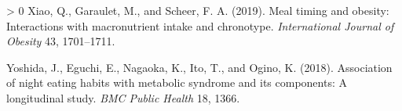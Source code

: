 \documentclass[utf8]{frontiersSCNS}
\newlength{\cslhangindent}
\newenvironment{CSLReferences}[3] %
 {%
  \setlength{\parindent}{0pt}
  \ifodd #1 \everypar{\setlength{\hangindent}{\cslhangindent}}\ignorespaces\fi
  \ifnum #2 > 0
  \setlength{\parskip}{#2\baselineskip}
  \fi
 }%
 {}
\begin{document}
\begin{CSLReferences}{1}{0}
\leavevmode\hypertarget{ref-xiao2019meal}{}%
Xiao, Q., Garaulet, M., and Scheer, F. A. (2019). Meal timing and
obesity: Interactions with macronutrient intake and chronotype.
\emph{International Journal of Obesity} 43, 1701--1711.

\leavevmode\hypertarget{ref-yoshida2018association}{}%
Yoshida, J., Eguchi, E., Nagaoka, K., Ito, T., and Ogino, K. (2018).
Association of night eating habits with metabolic syndrome and its
components: A longitudinal study. \emph{BMC Public Health} 18, 1366.

\end{CSLReferences}
\end{document}
